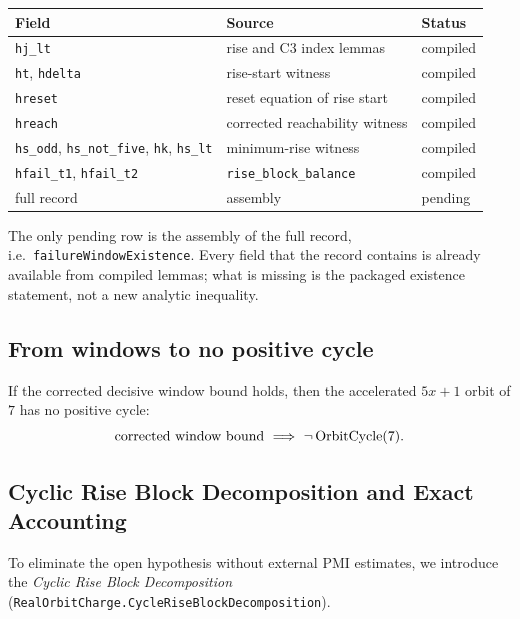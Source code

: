 \begin{center}
\small
\begin{tabular}{@{}p{}p{}p{}@{}}
\toprule
Field & Source & Status \\
\midrule
\texttt{hj\_lt} & rise and C3 index lemmas & compiled \\
\texttt{ht}, \texttt{hdelta} & rise-start witness & compiled \\
\texttt{hreset} & reset equation of rise start & compiled \\
\texttt{hreach} & corrected reachability witness & compiled \\
\texttt{hs\_odd}, \texttt{hs\_not\_five}, \texttt{hk}, \texttt{hs\_lt} &
  minimum-rise witness & compiled \\
\texttt{hfail\_t1}, \texttt{hfail\_t2} & \texttt{rise\_block\_balance} &
  compiled \\
full record & assembly & pending \\
\bottomrule
\end{tabular}
\end{center}

The only pending row is the assembly of the full record, i.e.\
\texttt{failureWindowExistence}.  Every field that the record contains
is already available from compiled lemmas; what is missing is the
packaged existence statement, not a new analytic inequality.

\subsection{From windows to no positive cycle}

\begin{theorem}\label{thm:bridge}
If the corrected decisive window bound holds, then the accelerated
$5x+1$ orbit of $7$ has no positive cycle:
\begin{equation*}
  \text{corrected window bound}\ \Longrightarrow\ \neg\,\mathrm{OrbitCycle}(7).
\end{equation*}
\end{theorem}

\subsection{Cyclic Rise Block Decomposition and Exact Accounting}

To eliminate the open hypothesis without external PMI estimates, we introduce the \emph{Cyclic Rise Block Decomposition} (\texttt{RealOrbitCharge.CycleRiseBlockDecomposition}).

